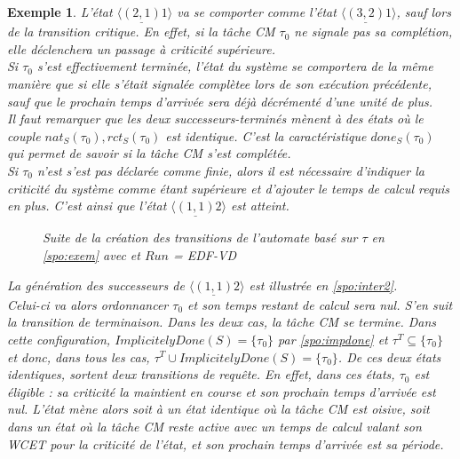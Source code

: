 \documentclass[12pt,a4paper,oneside]{book}
\theoremstyle{break}
\newtheorem{exem}{Exemple}[chapter]
\theoremstyle{breakplain}
\begin{document}
\begin{exem}
L'état $\langle \underline{(2, 1)} 1 \rangle$ va se comporter comme l'état $\langle \underline{(3, 2)} 1\rangle$, sauf lors de la transition critique. En effet, si la tâche CM $\tau_0$ ne signale pas sa complétion, elle déclenchera un passage à criticité supérieure.\\

Si $\tau_0$ s'est effectivement terminée, l'état du système se comportera de la même manière que si elle s'était signalée complètee lors de son exécution précédente, sauf que le prochain temps d'arrivée sera déjà décrémenté d'une unité de plus.\\

Il faut remarquer que les deux \textit{successeurs-terminé}s mènent à des états où le couple $nat_S(\tau_0), rct_S(\tau_0)$ est identique. C'est la caractéristique $done_S(\tau_0)$ qui permet de savoir si la tâche CM s'est complétée.\\

Si $\tau_0$ n'est s'est pas déclarée comme finie, alors il est nécessaire d'indiquer la criticité du système comme étant supérieure et d'ajouter le temps de calcul requis en plus. C'est ainsi que l'état $ \langle \underline{(1, 1)} 2 \rangle $ est atteint.
\begin{figure}[h]
    \centering
    \resizebox{\textwidth}{!}{
    \fontsize{28pt}{12pt}\selectfont
    
    }
    
\caption{Suite de la création des transitions de l'automate basé sur $\tau$ en \autoref{spo:exem} avec et $Run$ = \textit{EDF-VD}}
\label{spo:inter2}
\end{figure}

La génération des successeurs de $\langle \underline{(1, 1)} 2 \rangle $ est illustrée en \autoref{spo:inter2}.\\

Celui-ci va alors ordonnancer $\tau_0$ et son temps restant de calcul sera nul. S'en suit la transition de terminaison. Dans les deux cas, la tâche CM se termine. Dans cette configuration, $ImplicitelyDone(S) = \{\tau_0\}$ par \autoref{spo:impdone} et $\tau^T \subseteq \{\tau_0\}$ et donc, dans tous les cas, $\tau^T \cup ImplicitelyDone(S) = \{\tau_0\}$. De ces deux états identiques, sortent deux transitions de requête. En effet, dans ces états, $\tau_0$ est éligible : sa criticité la maintient en course et son prochain temps d'arrivée est nul. L'état mène alors soit à un état identique où la tâche CM est oisive, soit dans un état où la tâche CM reste active avec un temps de calcul valant son WCET pour la criticité de l'état, et son prochain temps d'arrivée est sa période.\\


\end{exem}
\end{document}
